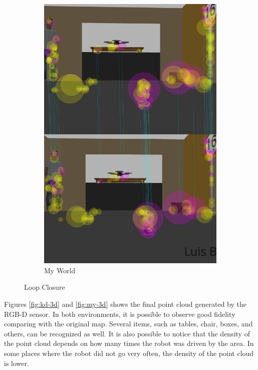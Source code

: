 \documentclass[10pt,journal,compsoc]{IEEEtran}
\begin{document}
\begin{figure}[H]
\begin{subfigure}{.5\linewidth}
  \includegraphics[width=.95\linewidth]{my_world_loop_closure.png}
  \caption{My World}
  \label{fig:my-loopclosure}
\end{subfigure}
\caption{Loop Closure}
\label{fig:loopclosure}
\end{figure}

Figures \ref{fig:kd-3d} and \ref{fig:my-3d} shows the final point cloud generated by the RGB-D sensor. In both environments, it is possible to observe good fidelity comparing with the original map. Several items, such as tables, chair, boxes, and others, can be recognized as well.
It is also possible to notice that the density of the point cloud depends on how many times the robot was driven by the area. In some places where the robot did not go very often, the density of the point cloud is lower.
\end{document}
